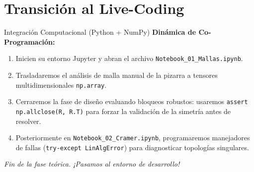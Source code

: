 \documentclass[aspectratio=169]{beamer}
\begin{document}
\section{Transición al Live-Coding}
\begin{frame}{Integración Computacional (Python + NumPy)}
    \textbf{Dinámica de Co-Programación:}
    \begin{enumerate}
        \item Inicien su entorno Jupyter y abran el archivo \texttt{Notebook\_01\_Mallas.ipynb}.
        \item Trasladaremos el análisis de malla manual de la pizarra a tensores multidimensionales \texttt{np.array}.
        \item Cerraremos la fase de diseño evaluando bloqueos robustos: usaremos \texttt{assert np.allclose(R, R.T)} para forzar la validación de la simetría antes de resolver.
        \item Posteriormente en \texttt{Notebook\_02\_Cramer.ipynb}, programaremos manejadores de fallas (\texttt{try-except LinAlgError}) para diagnosticar topologías singulares.
    \end{enumerate}
    
    \vspace{0.5cm}
    \begin{center}
        \textit{Fin de la fase teórica. ¡Pasamos al entorno de desarrollo!}
    \end{center}
\end{frame}
\end{document}
